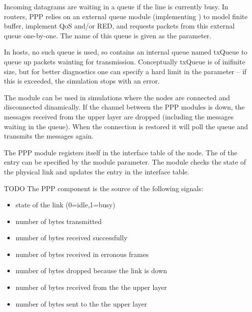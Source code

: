 Incoming datagrams are waiting in a queue if the line is currently busy.
In routers, PPP relies on an external queue module (implementing
) to model finite buffer, implement QoS and/or RED,
and requests packets from this external queue one-by-one. The name
of this queue is given as the  parameter.

In hosts, no such queue is used, so  contains an internal
queue named txQueue to queue up packets wainting for transmission.
Conceptually txQueue is of inifinite size, but for better diagnostics
one can specify a hard limit in the  parameter -- if
this is exceeded, the simulation stops with an error.

The module can be used in simulations where the nodes are connected and
disconnected dinamically. If the channel between the PPP modules is down,
the messages received from the upper layer are dropped (including the messages
waiting in the queue). When the connection is restored it will
poll the queue and transmits the messages again.

The PPP module registers itself in the interface table of the node.
The  of the entry can be specified by the
 module parameter. The module checks the state of the physical link
and updates the entry in the interface table.

\iffalse TODO
The node containing the PPP module must also contain a
\nedtype{NofiticationBoard} component. Notifications are sent when
transmission of a new PPP frame started (\verb!NF_PP_TX_BEGIN!), finished
(\verb!NF_PP_TX_END!) or when a PPP frame received (\verb!NF_PP_RX_END!).
\fi

\iffalse TODO
The PPP component is the source of the following signals:
\begin{itemize}
\item {} state of the link (0=idle,1=busy)
\item {} number of bytes transmitted
\item {} number of bytes received successfully
\item {} number of bytes received in erronous frames
\item {} number of bytes dropped because the link is down
\item {} number of bytes received from the the upper layer
\item {} number of bytes sent to the the upper layer
\end{itemize}

